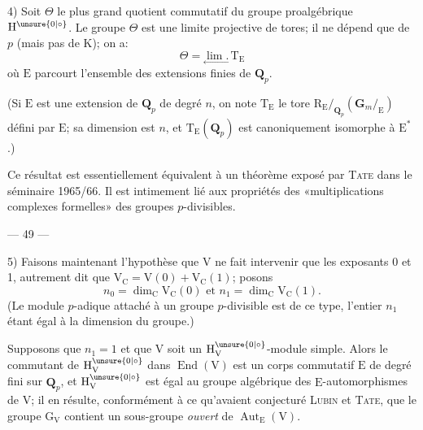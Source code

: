 4) Soit $\Theta$ le plus grand quotient commutatif du groupe proalgébrique $\mathrm H^{\unsure{0|\circ}}$. Le groupe $\Theta$ est une limite projective de tores; il ne dépend que de $p$ (mais pas de $\mathrm K$); on a:
\[
\Theta=\underset{\leftarrow}{\lim.}\,\mathrm T_{\mathrm E}
\]
où $\mathrm E$ parcourt l'ensemble des extensions finies de $\mathbf Q_p$.

(Si $\mathrm E$ est une extension de $\mathbf Q_p$ de degré $n$, on note $\mathrm T_{\mathrm E}$ le tore $\mathrm R_{\mathrm E}/_{\mathbf Q_p}(\mathbf G_m/_{\mathrm E})$ défini par $\mathrm E$; sa dimension est $n$, et $\mathrm T_{\mathrm E}(\mathbf Q_p)$ est canoniquement isomorphe à $\mathrm E^*$.)

Ce résultat est essentiellement équivalent à un théorème exposé par \textsc{Tate} dans le séminaire 1965/66. Il est intimement lié aux propriétés des «multiplications complexes formelles» des groupes $p$-divisibles.

\begin{center}--- 49 ---\end{center}

5) Faisons maintenant l'hypothèse que $\mathrm V$ ne fait intervenir que les exposants 0 et 1, autrement dit que $\mathrm V_{\mathrm C}=\mathrm V(0)+\mathrm V_{\mathrm C}(1)$; posons
\[
n_0=\dim_{\mathrm C}\mathrm V_{\mathrm C}(0)\text{ et }n_1=\dim_{\mathrm C}\mathrm V_{\mathrm C}(1).
\]
(Le module $p$-adique attaché à un groupe $p$-divisible est de ce type, l'entier $n_1$ étant égal à la dimension du groupe.)

Supposons que $n_1=1$ et que $\mathrm V$ soit un $\mathrm H_{\mathrm V}^{\unsure{0|\circ}}$-module simple. Alors le commutant de $\mathrm H_{\mathrm V}^{\unsure{0|\circ}}$ dans $\operatorname{End}(\mathrm V)$ est un corps commutatif $\mathrm E$ de degré fini sur $\mathbf Q_p$, et $\mathrm H_{\mathrm V}^{\unsure{0|\circ}}$ est égal au groupe algébrique des $\mathrm E$-automorphismes de $\mathrm V$; il en résulte, conformément à ce qu'avaient conjecturé \textsc{Lubin} et \textsc{Tate}, que le groupe $\mathrm G_{\mathrm V}$ contient un sous-groupe \textit{ouvert} de $\operatorname{Aut}_{\mathrm E}(\mathrm V)$.


